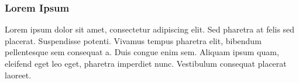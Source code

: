 \begin{frame}
    \frametitle{Lorem Ipsum}
    \vspace*{\fill} 
        Lorem ipsum dolor sit amet, consectetur adipiscing elit. Sed pharetra at felis sed placerat. Suspendisse potenti. Vivamus tempus pharetra elit, bibendum pellentesque sem consequat a. Duis congue enim sem. Aliquam ipsum quam, eleifend eget leo eget, pharetra imperdiet nunc. Vestibulum consequat placerat laoreet.
    \vspace*{\fill} 
\end{frame}